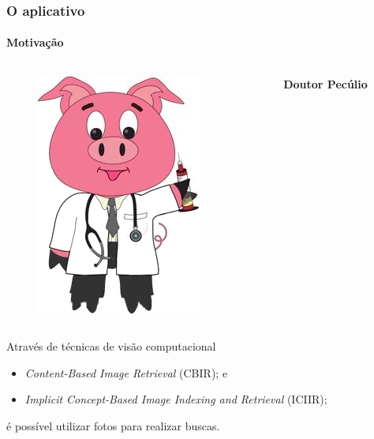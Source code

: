 \documentclass[14pt,beamer]{beamer}
\begin{document}
\begin{frame}
	\frametitle{O aplicativo}
    \framesubtitle{Motivação}
	
	\vspace{-30px}
	\begin{columns}
		\begin{column}{.3\textwidth}
			\begin{figure}
				\includegraphics[scale=.15]{imagens/docpig}
			\end{figure}
		\end{column}%
		\hfill%
		\begin{column}{9\textwidth}
			\large{\textbf{Doutor Pecúlio}}
		\end{column}%
	\end{columns}
	
	\vspace{20px}
	Através de técnicas de visão computacional
            \begin{itemize}
            \item \emph{Content-Based Image Retrieval} (CBIR); e
            \item \emph{Implicit Concept-Based Image Indexing and Retrieval} (ICIIR);
            \end{itemize}
    é possível utilizar fotos para realizar buscas.
\end{frame}
\end{document}
